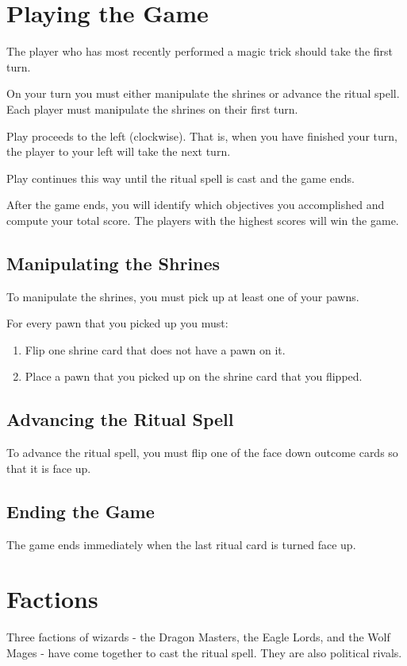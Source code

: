 \documentclass[10pt, parskip=half-, twoside]{scrartcl}
\begin{document}
\section*{Playing the Game}
The player who has most recently performed a magic trick should take the first turn.

On your turn you must either manipulate the shrines or advance the ritual spell. Each player must manipulate the shrines on their first turn.

Play proceeds to the left (clockwise). That is, when you have finished your turn, the player to your left will take the next turn.

Play continues this way until the ritual spell is cast and the game ends.

After the game ends, you will identify which objectives you accomplished and compute your total score. The players with the highest scores will win the game.

\newpage
 
\subsection*{Manipulating the Shrines}
To manipulate the shrines, you must pick up at least one of your pawns.

For every pawn that you picked up you must:
	\begin{enumerate}[itemindent=*, leftmargin=*]
	\item Flip one shrine card that does not have a pawn on it.
	\item Place a pawn that you picked up on the shrine card that you flipped.
	\end{enumerate}

\subsection*{Advancing the Ritual Spell}
To advance the ritual spell, you must flip one of the face down outcome cards so that it is face up.
	
\subsection*{Ending the Game}
The game ends immediately when the last ritual card is turned face up.

\newpage

\section*{Factions}
Three factions of wizards - the Dragon Masters, the Eagle Lords, and the Wolf Mages - have come together to cast the ritual spell. They are also political rivals.
\end{document}
